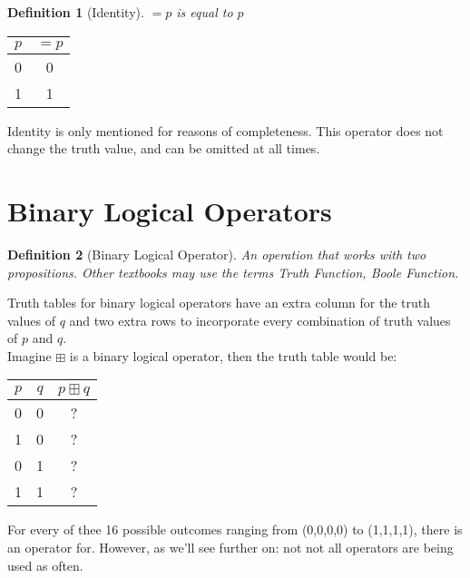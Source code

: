 \documentclass[10pt,a4paper,draft,titlepage,onecolumn]{book}
\newtheorem{definition}{Definition}[section]
\begin{document}
\begin{definition}[Identity]
$=p$ is equal to $p$
\end{definition}

\begin{center}
\begin{tabular}{ |c|c| }
 \hline
 $p$ & $=p$  \\
 \hline
 0 &0 \\
 1 & 1\\
 \hline
\end{tabular} 
\end{center} 
Identity is only mentioned for reasons of completeness. This operator does not change the truth value, and can be omitted at all times.

\section{Binary Logical Operators}
\begin{definition}[Binary Logical Operator]
An operation that works with two propositions. Other textbooks may use the terms \textit{Truth Function}, \textit{Boole Function}.
\end{definition}
Truth tables for binary logical operators have an extra column for the truth values of $q$ and two extra rows to incorporate every combination of truth values of $p$ and $q$. \\
Imagine $\boxplus$ is a binary logical operator, then the truth table would be:

\begin{center}
\begin{tabular}{ |c|c|c| }

 \hline
 $p$ & $q$ & $p \boxplus q$ \\
 \hline
 0 & 0 & ? \\
 1 & 0 & ? \\
 0 & 1 & ? \\
 1 & 1 & ? \\
 \hline
\end{tabular}
\end{center}
For every of thee 16 possible outcomes ranging from (0,0,0,0) to  (1,1,1,1), there is an operator for. However, as we'll see further on: not not all operators are being used as often.
\end{document}
